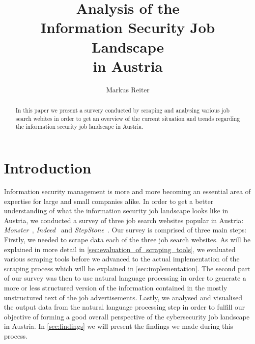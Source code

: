 \documentclass[runningheads]{llncs}
\begin{document}
\title{Analysis of the \\ Information Security Job Landscape \\ in Austria}

\author{Markus Reiter}


\maketitle

\newpage

\begin{abstract}

In this paper we present a survery conducted by scraping and analysing various job search webites in order to get an overview of the current situation and trends regarding the information security job landscape in Austria.


\end{abstract}

\newpage

\section{Introduction}
\label{sec:introduction}

Information security management is more and more becoming an essential area of expertise for large and small companies alike. In order to get a better understanding of what the information security job landscape looks like in Austria, we conducted a survey of three job search websites popular in Austria: \textit{Monster}~\cite{monster}, \textit{Indeed}~\cite{indeed} and \textit{StepStone}~\cite{stepstone}. Our survey is comprised of three main steps: Firstly, we needed to scrape data each of the three job search websites. As will be explained in more detail in \autoref{sec:evaluation_of_scraping_tools}, we evaluated various scraping tools before we advanced to the actual implementation of the scraping process which will be explained in \autoref{sec:implementation}. The second part of our survey was then to use natural language processing in order to generate a more or less structured version of the information contained in the mostly unstructured text of the job advertisements. Lastly, we analysed and visualised the output data from the natural language processing step in order to fulfill our objective of forming a good overall perspective of the cybersecurity job landscape in Austria. In \autoref{sec:findings} we will present the findings we made during this process.
\end{document}
